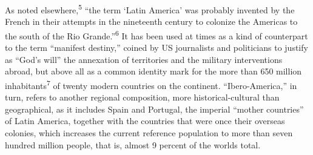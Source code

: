 \documentclass{tufte-handout}
\begin{document}
As noted elsewhere,\textsuperscript{5} ``the term `Latin
America' was probably invented by the French in their attempts in the
nineteenth century to colonize the Americas to the south of the Rio
Grande.''\textsuperscript{6} It has been used at times as
a kind of counterpart to the term ``manifest destiny,'' coined by US
journalists and politicians to justify as ``God's will'' the annexation
of territories and the military interventions abroad, but above all as a
common identity mark for the more than 650 million
inhabitants\textsuperscript{7} of twenty modern
countries on the continent. ``Ibero-America,'' in turn, refers to
another regional composition, more historical-cultural than
geographical, as it includes Spain and Portugal, the imperial ``mother
countries'' of Latin America, together with the countries that were once
their overseas colonies, which increases the current reference
population to more than seven hundred million people, that is, almost 9
percent of the world\textquotesingle s total.
\end{document}
